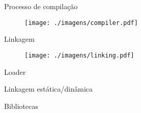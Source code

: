 \documentclass{beamer}
\begin{document}


\begin{frame}{Processo de compilação}
    \begin{figure}[h]
        \centering
        \texttt{[image: ./imagens/compiler.pdf]}
    \end{figure}
\end{frame}

\begin{frame}{Linkagem}
    \begin{figure}[h]
        \centering
        \texttt{[image: ./imagens/linking.pdf]}
    \end{figure}
\end{frame}

\begin{frame}{Loader}
    
\end{frame}

\begin{frame}{Linkagem estática/dinâmica}
    
\end{frame}

\begin{frame}{Bibliotecas}
    
\end{frame}
\end{document}
